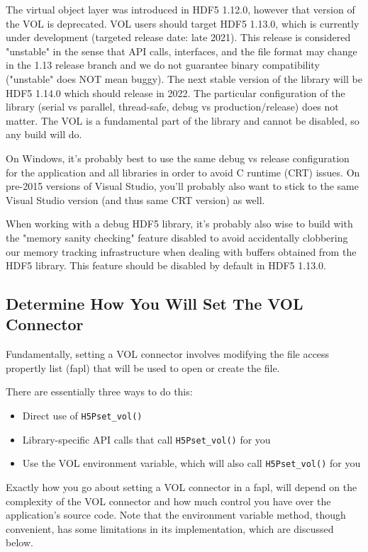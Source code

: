 The virtual object layer was introduced in HDF5 1.12.0, however that version of the VOL is deprecated. VOL users should target HDF5 1.13.0, which is currently under development (targeted release date: late 2021). This release is considered "unstable" in the sense that API calls, interfaces, and the file format may change in the 1.13 release branch and we do not guarantee binary compatibility ("unstable" does NOT mean buggy). The next stable version of the library will be HDF5 1.14.0 which should release in 2022. The particular configuration of the library (serial vs parallel, thread-safe, debug vs production/release) does not matter. The VOL is a fundamental part of the library and cannot be disabled, so any build will do.

On Windows, it's probably best to use the same debug vs release configuration for the application and all libraries in order to avoid C runtime (CRT) issues. On pre-2015 versions of Visual Studio, you'll probably also want to stick to the same Visual Studio version (and thus same CRT version) as well.

When working with a debug HDF5 library, it's probably also wise to build with the "memory sanity checking" feature disabled to avoid accidentally clobbering our memory tracking infrastructure when dealing with buffers obtained from the HDF5 library. This feature should be disabled by default in HDF5 1.13.0.

\subsection{Determine How You Will Set The VOL Connector}

Fundamentally, setting a VOL connector involves modifying the file access propertly list (fapl) that will be used to open or create the file.

There are essentially three ways to do this:

\begin{itemize}
    \item Direct use of {\tt H5Pset\_vol()}
    \item Library-specific API calls that call {\tt H5Pset\_vol()} for you
    \item Use the VOL environment variable, which will also call {\tt H5Pset\_vol()} for you
\end{itemize}

Exactly how you go about setting a VOL connector in a fapl, will depend on the complexity of the VOL connector and how much control you have over the application's source code.
Note that the environment variable method, though convenient, has some limitations in its implementation, which are discussed below.


